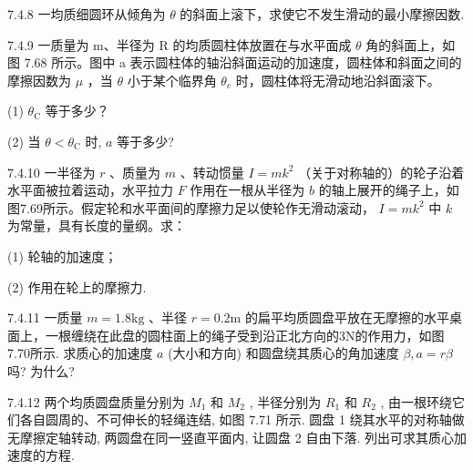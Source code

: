 \begin{problem}{7.4.8}
一均质细圆环从倾角为 $\theta$ 的斜面上滚下，求使它不发生滑动的最小摩擦因数.
\end{problem}
\clearpage


\begin{problem}{7.4.9}
一质量为 m、半径为 R 的均质圆柱体放置在与水平面成 $\theta$ 角的斜面上，如图 7.68 所示。图中 a 表示圆柱体的轴沿斜面运动的加速度，圆柱体和斜面之间的摩擦因数为 $\mu$ ，当 $\theta$ 小于某个临界角 $\theta_{c}$ 时，圆柱体将无滑动地沿斜面滚下。

(1) $\theta_{\mathrm{C}}$ 等于多少？

(2) 当 $\theta < \theta_{\mathrm{C}}$ 时, $a$ 等于多少?
\begin{center}

\end{center}
\end{problem}
\clearpage


\begin{problem}{7.4.10}
一半径为 $r$ 、质量为 $m$ 、转动惯量 $I = mk^2$ （关于对称轴的）的轮子沿着水平面被拉着运动，水平拉力 $F$ 作用在一根从半径为 $b$ 的轴上展开的绳子上，如图7.69所示。假定轮和水平面间的摩擦力足以使轮作无滑动滚动， $I = mk^2$ 中 $k$ 为常量，具有长度的量纲。求：

(1) 轮轴的加速度；

(2) 作用在轮上的摩擦力.
\begin{center}

\end{center}
\end{problem}
\clearpage


\begin{problem}{7.4.11}
一质量 $m = 1.8\mathrm{kg}$ 、半径 $r = 0.2\mathrm{m}$ 的扁平均质圆盘平放在无摩擦的水平桌面上，一根缠绕在此盘的圆柱面上的绳子受到沿正北方向的3N的作用力，如图7.70所示. 求质心的加速度 $a$ (大小和方向) 和圆盘绕其质心的角加速度 $\beta, a = r\beta$ 吗? 为什么?
\begin{center}

\end{center}
\end{problem}
\clearpage


\begin{problem}{7.4.12}
两个均质圆盘质量分别为 $M_{1}$ 和 $M_{2}$ , 半径分别为 $R_{1}$ 和 $R_{2}$ , 由一根环绕它们各自圆周的、不可伸长的轻绳连结, 如图 7.71 所示. 圆盘 1 绕其水平的对称轴做无摩擦定轴转动, 两圆盘在同一竖直平面内, 让圆盘 2 自由下落. 列出可求其质心加速度的方程.
\begin{center}

\end{center}
\end{problem}
\clearpage


